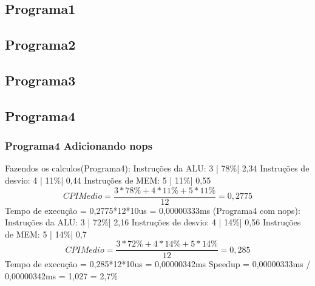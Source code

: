 \documentclass{article}
\begin{document}
\subsection{Programa1}

\newpage

\subsection{Programa2}

\newpage

\subsection{Programa3}

\newpage

\subsection{Programa4}

\newpage

\subsubsection{Programa4 Adicionando nops}

\newpage

Fazendos os calculos(Programa4):
\newline
Instruções da ALU:    3 | 78\%| 2,34
\newline
Instruções de desvio: 4 | 11\%| 0,44
\newline
Instruções de MEM:    5 | 11\%| 0,55
\newline
\begin{equation}
CPI Medio = \frac{3*78\%+4*11\%+5*11\%}{12} = 0,2775
\end{equation}
\newline
Tempo de execução = 0,2775*12*10us = 0,00000333ms
\newline
\newline
(Programa4 com nops):
\newline
Instruções da ALU:    3 | 72\%| 2,16
\newline
Instruções de desvio: 4 | 14\%| 0,56
\newline
Instruções de MEM:    5 | 14\%| 0,7
\newline
\begin{equation}
CPI Medio = \frac{3*72\%+4*14\%+5*14\%}{12} = 0,285
\end{equation}
\newline
Tempo de execução = 0,285*12*10us = 0,00000342ms
\newline
Speedup = 0,00000333ms / 0,00000342ms = 1,027 = 2,7\%
\newpage
\end{document}
